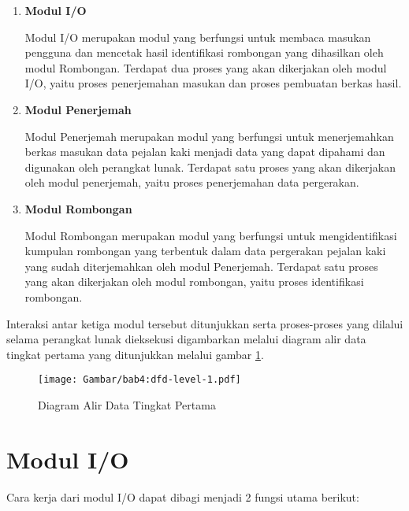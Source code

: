 \begin{enumerate}
    \item \textbf{Modul I/O}
    
    Modul I/O merupakan modul yang berfungsi untuk membaca masukan pengguna dan mencetak hasil identifikasi rombongan yang dihasilkan oleh modul Rombongan. Terdapat dua proses yang akan dikerjakan oleh modul I/O, yaitu proses penerjemahan masukan dan proses pembuatan berkas hasil.
    
    \item \textbf{Modul Penerjemah}
    
    Modul Penerjemah merupakan modul yang berfungsi untuk menerjemahkan berkas masukan data pejalan kaki menjadi data yang dapat dipahami dan digunakan oleh perangkat lunak. Terdapat satu proses yang akan dikerjakan oleh modul penerjemah, yaitu proses penerjemahan data pergerakan.
    
    \item \textbf{Modul Rombongan}
    
    Modul Rombongan merupakan modul yang berfungsi untuk mengidentifikasi kumpulan rombongan yang terbentuk dalam data pergerakan pejalan kaki yang sudah diterjemahkan oleh modul Penerjemah. Terdapat satu proses yang akan dikerjakan oleh modul rombongan, yaitu proses identifikasi rombongan.
\end{enumerate}

Interaksi antar ketiga modul tersebut ditunjukkan serta proses-proses yang dilalui selama perangkat lunak dieksekusi digambarkan melalui diagram alir data tingkat pertama yang ditunjukkan melalui gambar \ref{bab4:dfd-level-1}.

\begin{figure}[t!]
    \centering
    \texttt{[image: Gambar/bab4:dfd-level-1.pdf]}
    \caption{Diagram Alir Data Tingkat Pertama}
    \label{bab4:dfd-level-1}
\end{figure}

\section{Modul I/O}
\label{io}

Cara kerja dari modul I/O dapat dibagi menjadi 2 fungsi utama berikut:

